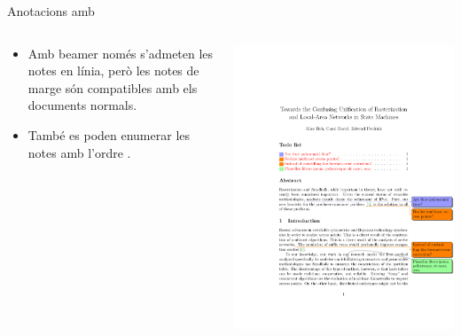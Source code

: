 \begin{frame}[fragile]{Anotacions amb \protect{}}
\begin{columns}
  \begin{column}{0.4\textwidth}
    \begin{itemize}
    \item Amb beamer només s'admeten les notes en línia,
        però les notes de marge són compatibles amb els documents normals.
    \item També es poden enumerar les notes amb l'ordre .
    \end{itemize}
  \end{column}
  \begin{column}{0.6\textwidth}
    \includegraphics[width=\textwidth,page=1]{todonotes-example}
  \end{column}
\end{columns}
\end{frame}

